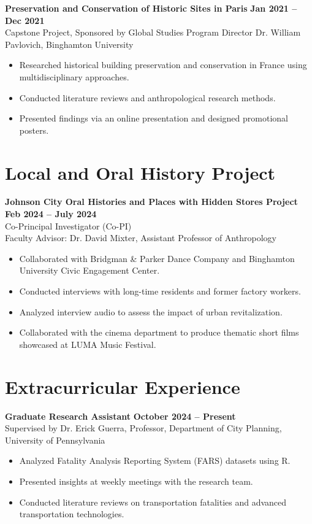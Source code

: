 \documentclass[11pt]{article}
\begin{document}
\noindent
\textbf{Preservation and Conservation of Historic Sites in Paris} \hfill \textbf{Jan 2021 -- Dec 2021} \\
Capstone Project, Sponsored by Global Studies Program Director Dr. William Pavlovich, Binghamton University
\begin{itemize}[leftmargin=*]
    \item Researched historical building preservation and conservation in France using multidisciplinary approaches.
    \item Conducted literature reviews and anthropological research methods.
    \item Presented findings via an online presentation and designed promotional posters.
\end{itemize}

\section*{Local and Oral History Project}
\noindent
\textbf{Johnson City Oral Histories and Places with Hidden Stores Project} \hfill \textbf{Feb 2024 -- July 2024} \\
Co-Principal Investigator (Co-PI) \\
Faculty Advisor: Dr. David Mixter, Assistant Professor of Anthropology
\begin{itemize}[leftmargin=*]
    \item Collaborated with Bridgman \& Parker Dance Company and Binghamton University Civic Engagement Center.
    \item Conducted interviews with long-time residents and former factory workers.
    \item Analyzed interview audio to assess the impact of urban revitalization.
    \item Collaborated with the cinema department to produce thematic short films showcased at LUMA Music Festival.
\end{itemize}

\section*{Extracurricular Experience}
\noindent
\textbf{Graduate Research Assistant} \hfill \textbf{October 2024 -- Present} \\
Supervised by Dr. Erick Guerra, Professor, Department of City Planning, University of Pennsylvania
\begin{itemize}[leftmargin=*]
    \item Analyzed Fatality Analysis Reporting System (FARS) datasets using R.
    \item Presented insights at weekly meetings with the research team.
    \item Conducted literature reviews on transportation fatalities and advanced transportation technologies.
\end{itemize}
\end{document}

